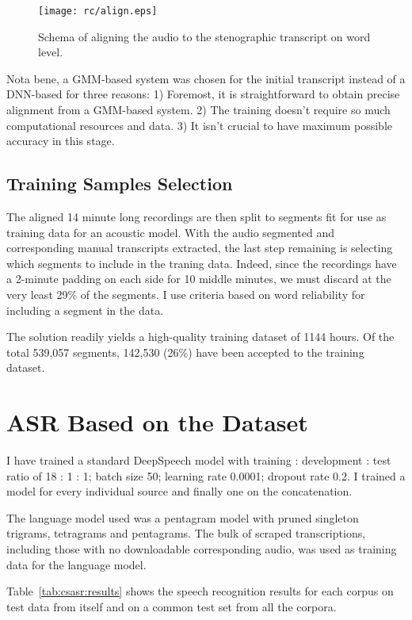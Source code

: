 \documentclass[hidelinks,12pt,a4paper]{report}
\begin{document}
\begin{figure}[htpb]
\texttt{[image: rc/align.eps]}
\caption{Schema of aligning the audio to the stenographic transcript on word
level.}
\label{fig:align}
\end{figure}

Nota bene, a GMM-based system was chosen for the initial transcript instead of
a DNN-based for three reasons: 1) Foremost, it is straightforward to obtain
precise alignment from a GMM-based system. 2) The training doesn't require so
much computational resources and data. 3) It isn't crucial to have maximum possible
accuracy in this stage.

\subsection{Training Samples Selection}

The aligned 14 minute long recordings are then split to segments fit for use as
training data for an acoustic model.
With the audio segmented and corresponding manual transcripts extracted, the
last step remaining is selecting which segments to include in the traning data.
Indeed, since the recordings have a 2-minute padding on each side for 10 middle
minutes, we must discard at the very least 29\% of the segments. I use
criteria based on word reliability for including a segment in the data.

The solution readily yields a high-quality training dataset of 1144
hours. Of the total 539,057 segments, 142,530 (26\%) have been accepted to the
training dataset.

\section{ASR Based on the Dataset}

I have trained a standard DeepSpeech model with training :
development : test ratio of 18 : 1 : 1; batch size 50; learning rate 0.0001; dropout
rate 0.2. I trained a model for every individual source and finally one on the
concatenation.

The language model used was a pentagram model with pruned singleton trigrams,
tetragrams and pentagrams. The bulk of scraped transcriptions, including those
with no downloadable corresponding audio, was used as training data for the
language model.

Table~\ref{tab:csasr:results} shows the speech recognition
results for each corpus on test data from itself and on a common test set from
all the corpora.
\end{document}

